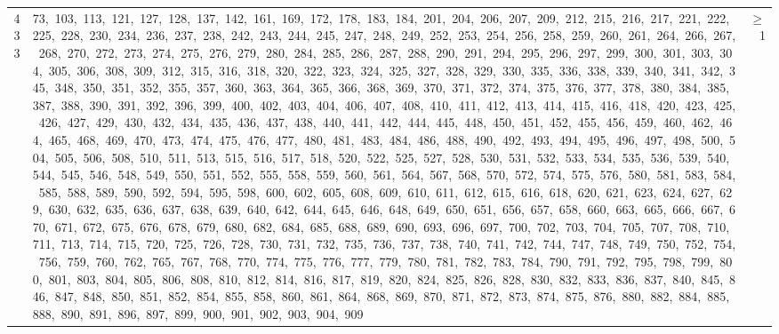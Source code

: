 \begin{longtable}{c|p{}|r}
433 & 73,\ 103,\ 113,\ 121,\ 127,\ 128,\ 137,\ 142,\ 161,\ 169,\ 172,\ 178,\ 183,\ 184,\ 201,\ 204,\ 206,\ 207,\ 209,\ 212,\ 215,\ 216,\ 217,\ 221,\ 222,\ 225,\ 228,\ 230,\ 234,\ 236,\ 237,\ 238,\ 242,\ 243,\ 244,\ 245,\ 247,\ 248,\ 249,\ 252,\ 253,\ 254,\ 256,\ 258,\ 259,\ 260,\ 261,\ 264,\ 266,\ 267,\ 268,\ 270,\ 272,\ 273,\ 274,\ 275,\ 276,\ 279,\ 280,\ 284,\ 285,\ 286,\ 287,\ 288,\ 290,\ 291,\ 294,\ 295,\ 296,\ 297,\ 299,\ 300,\ 301,\ 303,\ 304,\ 305,\ 306,\ 308,\ 309,\ 312,\ 315,\ 316,\ 318,\ 320,\ 322,\ 323,\ 324,\ 325,\ 327,\ 328,\ 329,\ 330,\ 335,\ 336,\ 338,\ 339,\ 340,\ 341,\ 342,\ 345,\ 348,\ 350,\ 351,\ 352,\ 355,\ 357,\ 360,\ 363,\ 364,\ 365,\ 366,\ 368,\ 369,\ 370,\ 371,\ 372,\ 374,\ 375,\ 376,\ 377,\ 378,\ 380,\ 384,\ 385,\ 387,\ 388,\ 390,\ 391,\ 392,\ 396,\ 399,\ 400,\ 402,\ 403,\ 404,\ 406,\ 407,\ 408,\ 410,\ 411,\ 412,\ 413,\ 414,\ 415,\ 416,\ 418,\ 420,\ 423,\ 425,\ 426,\ 427,\ 429,\ 430,\ 432,\ 434,\ 435,\ 436,\ 437,\ 438,\ 440,\ 441,\ 442,\ 444,\ 445,\ 448,\ 450,\ 451,\ 452,\ 455,\ 456,\ 459,\ 460,\ 462,\ 464,\ 465,\ 468,\ 469,\ 470,\ 473,\ 474,\ 475,\ 476,\ 477,\ 480,\ 481,\ 483,\ 484,\ 486,\ 488,\ 490,\ 492,\ 493,\ 494,\ 495,\ 496,\ 497,\ 498,\ 500,\ 504,\ 505,\ 506,\ 508,\ 510,\ 511,\ 513,\ 515,\ 516,\ 517,\ 518,\ 520,\ 522,\ 525,\ 527,\ 528,\ 530,\ 531,\ 532,\ 533,\ 534,\ 535,\ 536,\ 539,\ 540,\ 544,\ 545,\ 546,\ 548,\ 549,\ 550,\ 551,\ 552,\ 555,\ 558,\ 559,\ 560,\ 561,\ 564,\ 567,\ 568,\ 570,\ 572,\ 574,\ 575,\ 576,\ 580,\ 581,\ 583,\ 584,\ 585,\ 588,\ 589,\ 590,\ 592,\ 594,\ 595,\ 598,\ 600,\ 602,\ 605,\ 608,\ 609,\ 610,\ 611,\ 612,\ 615,\ 616,\ 618,\ 620,\ 621,\ 623,\ 624,\ 627,\ 629,\ 630,\ 632,\ 635,\ 636,\ 637,\ 638,\ 639,\ 640,\ 642,\ 644,\ 645,\ 646,\ 648,\ 649,\ 650,\ 651,\ 656,\ 657,\ 658,\ 660,\ 663,\ 665,\ 666,\ 667,\ 670,\ 671,\ 672,\ 675,\ 676,\ 678,\ 679,\ 680,\ 682,\ 684,\ 685,\ 688,\ 689,\ 690,\ 693,\ 696,\ 697,\ 700,\ 702,\ 703,\ 704,\ 705,\ 707,\ 708,\ 710,\ 711,\ 713,\ 714,\ 715,\ 720,\ 725,\ 726,\ 728,\ 730,\ 731,\ 732,\ 735,\ 736,\ 737,\ 738,\ 740,\ 741,\ 742,\ 744,\ 747,\ 748,\ 749,\ 750,\ 752,\ 754,\ 756,\ 759,\ 760,\ 762,\ 765,\ 767,\ 768,\ 770,\ 774,\ 775,\ 776,\ 777,\ 779,\ 780,\ 781,\ 782,\ 783,\ 784,\ 790,\ 791,\ 792,\ 795,\ 798,\ 799,\ 800,\ 801,\ 803,\ 804,\ 805,\ 806,\ 808,\ 810,\ 812,\ 814,\ 816,\ 817,\ 819,\ 820,\ 824,\ 825,\ 826,\ 828,\ 830,\ 832,\ 833,\ 836,\ 837,\ 840,\ 845,\ 846,\ 847,\ 848,\ 850,\ 851,\ 852,\ 854,\ 855,\ 858,\ 860,\ 861,\ 864,\ 868,\ 869,\ 870,\ 871,\ 872,\ 873,\ 874,\ 875,\ 876,\ 880,\ 882,\ 884,\ 885,\ 888,\ 890,\ 891,\ 896,\ 897,\ 899,\ 900,\ 901,\ 902,\ 903,\ 904,\ 909 & $\ge$ 1 \\

\end{longtable}
